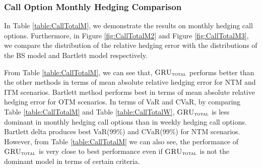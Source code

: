 \documentclass[letterpaper,12pt,titlepage,oneside,final]{book}
\numberwithin{equation}{section}
\theoremstyle{definition}
\newcommand{\modelT}{\textsc{GRU}_{\textsc{total}}}
\begin{document}
\subsubsection{Call Option Monthly Hedging Comparison}
In Table \ref{table:CallTotalM}, we demonstrate the results on monthly hedging call options. Furthermore, in Figure \ref{fig:CallTotalM2} and  Figure \ref{fig:CallTotalM3}, we compare the distribution of the relative hedging error with the distributions of the BS model and Bartlett model respectively.

From Table \ref{table:CallTotalM}, we can see that, $\modelT$ performs better than the other  methods in terms of 
mean absolute relative hedging error for NTM and ITM scenarios. Bartlett method performs best in terms of 
mean absolute relative hedging error for OTM scenarios. In terms of VaR and CVaR, by comparing Table \ref{table:CallTotalM} and Table \ref{table:CallTotalW}, $\modelT$ is less dominant  in monthly hedging call options than in weekly hedging call options.  Bartlett delta produces best VaR(99\%) and CVaR(99\%) for NTM scenarios. However, from Table \ref{table:CallTotalM} we can also see, the performance of $\modelT$ is  very close to best performance even if  $\modelT$ is not the dominant model in terms of certain criteria.
\end{document}

